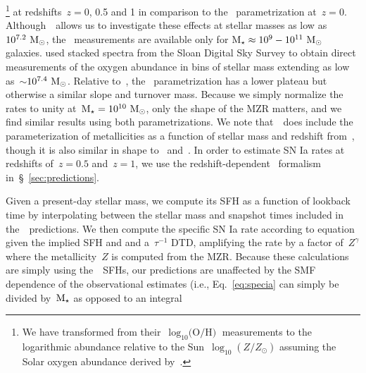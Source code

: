 \documentclass[foo.tex]{subfiles}
\begin{document}
\citet[][see their equation 5]{Zahid2014}\footnote{
	We have transformed from their~$\log_{10}\text{(O/H)}$ measurements to the
	logarithmic abundance relative to the Sun~$\log_{10}(Z / Z_\odot)$ assuming
	the Solar oxygen abundance derived by~\citet{Asplund2009}.
} at redshifts~$z = 0$, 0.5 and 1 in comparison to the~\citet{Andrews2013}
parametrization at~$z = 0$.
Although~\um~allows us to investigate these effects at stellar masses as low as
$10^{7.2}~\msun$, the~\citet{Zahid2014} measurements are available only for
$\mstar \approx 10^9 - 10^{11}~\msun$ galaxies.
\citet{Andrews2013} used stacked spectra from the Sloan Digital Sky Survey
\citep[SDSS;][]{York2000} to obtain direct measurements of the oxygen abundance
in bins of stellar mass extending as low as~$\sim$$10^{7.4}~\msun$.
Relative to~\citet{Zahid2014}, the~\citet{Andrews2013} parametrization has a
lower plateau but otherwise a similar slope and turnover mass.
Because we simply normalize the rates to unity at~$\mstar = 10^{10}~\msun$,
only the shape of the MZR matters, and we find similar results using both
parametrizations.
{\color{red}
We note that~\um~does include the parameterization of metallicities as a
function of stellar mass and redshift from~\citet{Maiolino2008}, though it is
also similar in shape to~\citet{Andrews2013} and~\citet{Zahid2014}.
}
In order to estimate SN Ia rates at redshifts of~$z = 0.5$ and~$z = 1$,
we use the redshift-dependent~\citet{Zahid2014} formalism
in~\S~\ref{sec:predictions}.
\par
Given a present-day stellar mass, we compute its SFH as a function of
lookback time by interpolating between the stellar mass and snapshot times
included in the~\um~predictions.
We then compute the specific SN Ia rate according to equation~
given the implied SFH and and a~$\tau^{-1}$ DTD, amplifying the rate by a
factor of~$Z^\gamma$ where the metallicity~$Z$ is computed from the
\citet{Zahid2014} MZR.
Because these calculations are simply using the~\um~SFHs,
{\color{red} our predictions}
are unaffected by the SMF dependence of the observational estimates (i.e.,
Eq.~\ref{eq:specia} can simply be divided by~$\mstar$ as opposed to an integral
$$
\end{document}
